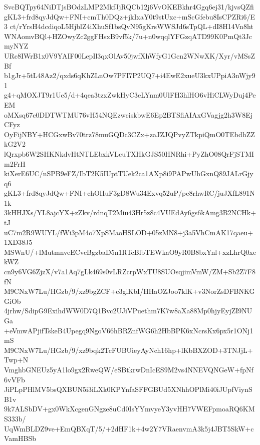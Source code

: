 SvcBQTpy64NiDTjsBOdzLMP2MkfJjRQCb12j6VvOKEBkhr4Ggq6ej31/kjvsQZfi
gKL3+frd8qyJdQw+FNI+cmTh0DQz+jkIxaY0t9stUxc+mScGfebu8IsCPZRi6/E3
ct/rYrsH4dcdiqoL5HjblZ4iXhuSf1bsQvN95gKrsWWSJd6sTpQL+dI8H14Vn8ht
WNAomvBQl+HZOwyZc2ggFHsxB9vf5k/7u+n0wqqlYFGzqATD99K0PmQt3JcmyNYZ
URc8IWrB1x0V9YAIF00LepIl3qxOlAv50jwfXhWfyG1Gcn2WNwXK/Xyr/vMSsZBf
b1gJr+5tL48Az2/qxds6qKhZLnOw7PFI7P2UQ7+i4EwE2xueU3kxUPpiA3nWjy91
g4+qMOXJT9r1Ue5/d+4qea3tzxZwkHyC3eLYnm0UlFH3hlHO6vHiCLWyDuj4PeEM
oMXsq67c0DDTWTMU76vH54NQEzwciskbwE6Ep2BTSfiAIAxGVagjg2h3W8EjCFyz
OyFijNBY+HCGxwBv70trz78muGQDc3CZx+zaJZJQPvyZTkpiQmO0TEbdhZZkG2V2
lQrxpb6W2SHKNkdvHtNTLEbxkVLcuTXHkGJS50HNRhi+PyZhO08QrFjSTMIm2FrH
kiXerE6UC/nSPB9eFZ/IbT2K5IUptTUek2ca1AXp8i9PAPwUhGxnQ89JALrGjyq6
gKL3+frd8qyJdQw+FNI+chOHuF3gD8Wu34Exvq52uP/pc8rhwRC/juJXfL891N1k
3kHHJXs/YL8ajcYX+zZkv/rdnqT2Miu43Hr5z8c4VUEdAy6gs6kAmg3B2NCHk+tJ
uC7m2R9WUYL/fWi3pM4o7XpSMaoHSLOD+05zMN8+j3a5VhCmAK17qaeu+1XD38J5
MSWnU/+lMutmnveECvcBgzbaD5n1RTcBlbTEWkaO9yR0B8bxYnl+xzLhrQ0xekWZ
cn9y6VG6ZjzX/v7a1Aq7gLk469s0vLRZcrpWxTU8SUOsqjimVmW/ZM+Sb2Z7F8fN
M9CNxW7Lu/HGzb/9/xz9bgZCF+c3glKbI/HHaOZJoo7klK+v3NorZsDFBNKGGiOb
4jrhw/SdipG9ExihdWW0D7Q1Bvc2UJiVPuethm7K7w8aXa88Mp0hjyEyjZI9NUGa
+eVmwAPjifTskeB4Upegq9NgoV66hBRZnfWG6h2HbBPK6xNcrsKx6px5r1ONj1mS
M9CNxW7Lu/HGzb/9/xz9bqk2TcFUBUieyAyNch16hp+lKbBXZOD+3TNJjL+Twp+N
VmghbGNEUz5yA1lo9gx2RweQW/eSBtkrwDnIcES9M2vs4NNEVQNGeW+fpNf6vVFb
JiPLpPHlMV5bsQXBUN5i3iLXk0KPYnfaSFFGBUd5XNhhOPlMi40iJUpfViynSB1v
9k7ALSbDV+gx0WkXcgenGNgze8uCd0IsYYmvyeY3yvHH7VWEFpmoaRQ6KMS333b/
UqWmBLDZ9ve+EmQBXqT/5/+2dHF1k+4w2Y7VRaenvmA3k5j4JBT5SkW+cVamHBSb
